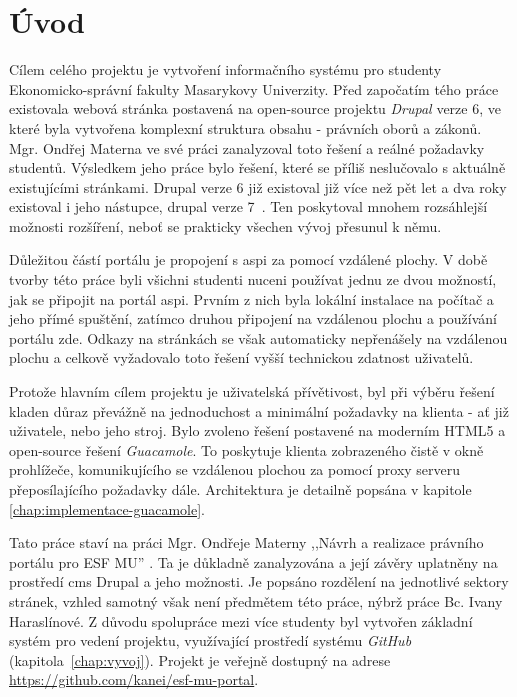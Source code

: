 \chapter{Úvod}
Cílem celého projektu je vytvoření informačního systému pro studenty Ekonomicko-správní fakulty Masarykovy Univerzity. Před započatím tého práce existovala webová stránka postavená na open-source projektu \emph{Drupal} verze 6, ve které byla vytvořena komplexní struktura obsahu - právních oborů a zákonů. Mgr. Ondřej Materna ve své práci zanalyzoval toto řešení a reálné požadavky studentů. Výsledkem jeho práce bylo řešení, které se příliš neslučovalo s aktuálně existujícími stránkami. Drupal verze 6 již existoval již více než pět let a dva roky existoval i jeho nástupce, drupal verze 7~\cite{website:wiki:drupal}. Ten poskytoval mnohem rozsáhlejší možnosti rozšíření, neboť se prakticky všechen vývoj přesunul k němu. 

Důležitou částí portálu je propojení s \gls{aspi} za pomocí vzdálené plochy. V době tvorby této práce byli všichni studenti nuceni používat jednu ze dvou možností, jak se připojit na portál \gls{aspi}. Prvním z nich byla lokální instalace na počítač a jeho přímé spuštění, zatímco druhou připojení na vzdálenou plochu a používání portálu zde. Odkazy na stránkách se však automaticky nepřenášely na vzdálenou plochu a celkově vyžadovalo toto řešení vyšší technickou zdatnost uživatelů.

Protože hlavním cílem projektu je uživatelská přívětivost, byl při výběru řešení kladen důraz převážně na jednoduchost a minimální požadavky na klienta - ať již uživatele, nebo jeho stroj. Bylo zvoleno řešení postavené na moderním HTML5 a open-source řešení \emph{Guacamole}. To poskytuje klienta zobrazeného čistě v okně prohlížeče, komunikujícího se vzdálenou plochou za pomocí proxy serveru přeposílajícího požadavky dále. Architektura je detailně popsána v kapitole \ref{chap:implementace-guacamole}.

Tato práce staví na práci Mgr. Ondřeje Materny ,,Návrh a realizace právního portálu pro ESF MU'' \cite{omaterna2013}. Ta je důkladně zanalyzována a její závěry uplatněny na prostředí \gls{cms} Drupal a jeho možnosti. Je popsáno rozdělení na jednotlivé sektory stránek, vzhled samotný však není předmětem této práce, nýbrž práce Bc. Ivany Haraslínové. Z důvodu spolupráce mezi více studenty byl vytvořen základní systém pro vedení projektu, využívající prostředí systému \emph{GitHub} (kapitola~\ref{chap:vyvoj}). Projekt je veřejně dostupný na adrese \url{https://github.com/kanei/esf-mu-portal}.
